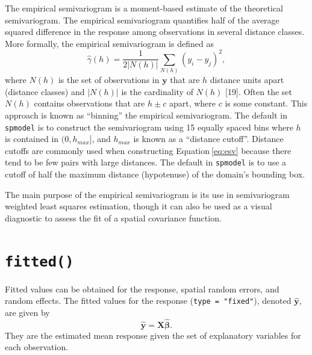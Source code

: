 \documentclass[10pt,letterpaper]{article}
\begin{document}
The empirical semivariogram is a moment-based estimate of the
theoretical semivariogram. The empirical semivariogram quantifies half
of the average squared difference in the response among observations in
several distance classes. More formally, the empirical semivariogram is
defined as \begin{equation}\label{eq:esv}
  \hat{\gamma}(h) = \frac{1}{2|N(h)|} \sum_{N(h)} (y_i - y_j)^2, 
\end{equation} where \(N(h)\) is the set of observations in
\(\mathbf{y}\) that are \(h\) distance units apart (distance classes)
and \(|N(h)|\) is the cardinality of \(N(h)\) {[}19{]}. Often the set
\(N(h)\) contains observations that are \(h \pm c\) apart, where \(c\)
is some constant. This approach is known as ``binning'' the empirical
semivariogram. The default in \texttt{spmodel} is to construct the
semivariogram using 15 equally spaced bins where \(h\) is contained in
\((0, h_{max}]\), and \(h_{max}\) is known as a ``distance cutoff''.
Distance cutoffs are commonly used when constructing
Equation\(~\)\ref{eq:esv} because there tend to be few pairs with large
distances. The default in \texttt{spmodel} is to use a cutoff of half
the maximum distance (hypotenuse) of the domain's bounding box.

The main purpose of the empirical semivariogram is its use in
semivariogram weighted least squares estimation, though it can also be
used as a visual diagnostic to assess the fit of a spatial covariance
function.

\hypertarget{sec:fitted}{%
\section{\texorpdfstring{\texttt{fitted()}}{fitted()}}\label{sec:fitted}}

Fitted values can be obtained for the response, spatial random errors,
and random effects. The fitted values for the response
(\texttt{type\ =\ "fixed"}), denoted \(\mathbf{\hat{y}}\), are given by
\begin{equation*}\label{eq:fit_resp}
  \mathbf{\hat{y}} = \mathbf{X} \boldsymbol{\hat{\beta}} .
\end{equation*} They are the estimated mean response given the set of
explanatory variables for each observation.
\end{document}
